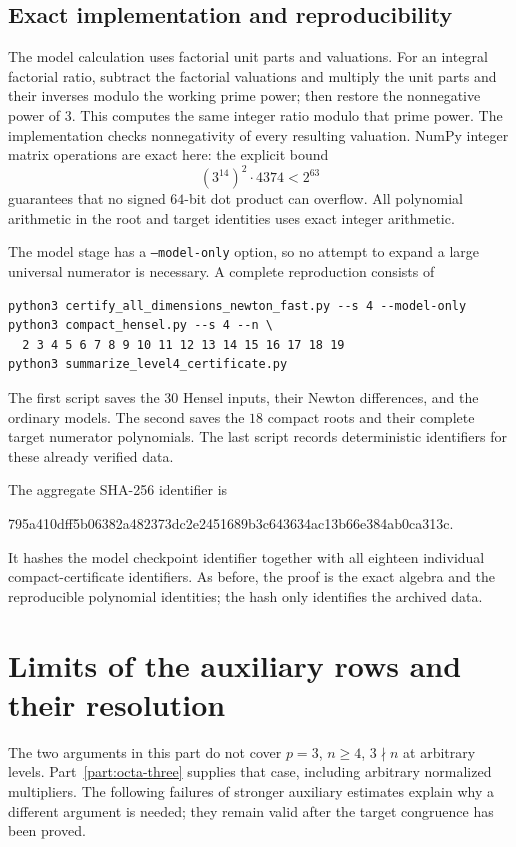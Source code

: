 \documentclass[11pt,a4paper]{article}
\theoremstyle{definition}\newtheorem{definition}[theorem]{Definition}
\theoremstyle{remark}\newtheorem{remark}[theorem]{Remark}
\numberwithin{equation}{section}
\begin{document}
\subsection{Exact implementation and reproducibility}
The model calculation uses factorial unit parts and valuations.  For
an integral factorial ratio, subtract the factorial valuations and
multiply the unit parts and their inverses modulo the working prime
power; then restore the nonnegative power of $3$.  This computes the
same integer ratio modulo that prime power.  The implementation
checks nonnegativity of every resulting valuation.
NumPy integer matrix operations are exact here: the explicit bound
\[
 (3^{14})^2\cdot4374<2^{63}
\]
guarantees that no signed $64$-bit dot product can overflow.  All
polynomial arithmetic in the root and target identities uses exact
integer arithmetic.

The model stage has a \texttt{--model-only} option, so no attempt to
expand a large universal numerator is necessary.  A complete
reproduction consists of
\begin{verbatim}
python3 certify_all_dimensions_newton_fast.py --s 4 --model-only
python3 compact_hensel.py --s 4 --n \
  2 3 4 5 6 7 8 9 10 11 12 13 14 15 16 17 18 19
python3 summarize_level4_certificate.py
\end{verbatim}
The first script saves the $30$ Hensel inputs, their Newton
differences, and the ordinary models.  The second saves the $18$
compact roots and their complete target numerator polynomials.  The
last script records deterministic identifiers for these already
verified data.

The aggregate SHA-256 identifier is
\begin{center}\ttfamily\small
795a410dff5b06382a482373dc2e2451689b3c643634ac13b66e384ab0ca313c.
\end{center}
It hashes the model checkpoint identifier together with all eighteen
individual compact-certificate identifiers.  As before, the proof is
the exact algebra and the reproducible polynomial identities; the
hash only identifies the archived data.
\section{Limits of the auxiliary rows and their resolution}\label{OP:source-main-10}
The two arguments in this part do not cover $p=3$, $n\ge4$,
$3\nmid n$ at arbitrary levels. Part~\ref{part:octa-three}
supplies that case, including arbitrary normalized multipliers.
The following failures of stronger auxiliary estimates explain
why a different argument is needed; they remain valid after the
target congruence has been proved.
\end{document}
